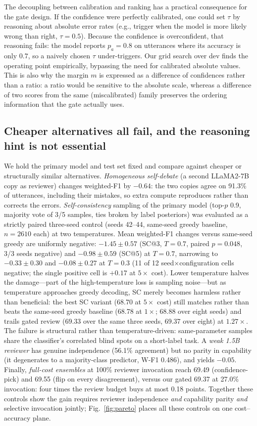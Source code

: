 \documentclass[final,5p,times,twocolumn]{elsarticle}
\begin{document}
The decoupling between calibration and ranking has a practical consequence
for the gate design. If the confidence were perfectly calibrated, one could
set $\tau$ by reasoning about absolute error rates (e.g., trigger when the
model is more likely wrong than right, $\tau{=}0.5$). Because the confidence
is overconfident, that reasoning fails: the model reports $p_a{=}0.8$ on
utterances where its accuracy is only $0.7$, so a naively chosen $\tau$
under-triggers. Our grid search over dev finds the operating point
empirically, bypassing the need for calibrated absolute values. This is
also why the margin $m$ is expressed as a difference of confidences rather
than a ratio: a ratio would be sensitive to the absolute scale, whereas a
difference of two scores from the same (miscalibrated) family preserves the
ordering information that the gate actually uses.

\subsection{Cheaper alternatives all fail, and the reasoning hint is not
essential}
\label{sec:controls}
We hold the primary model and test set fixed and compare against cheaper or
structurally similar alternatives.
\emph{Homogeneous self-debate} (a second LLaMA2-7B copy as reviewer) changes
weighted-F1 by $-0.64$: the two copies agree on 91.3\% of utterances,
including their mistakes, so extra compute reproduces rather than corrects
the errors. \emph{Self-consistency} sampling of the primary model
(top-$p$ 0.9, majority vote of 3/5 samples, ties broken by label posteriors)
was evaluated as a strictly paired three-seed control (seeds 42--44,
same-seed greedy baseline, $n{=}2610$ each) at two temperatures. Mean
weighted-F1 changes versus same-seed greedy are uniformly negative:
$-1.45 \pm 0.57$ (SC@3, $T{=}0.7$, paired $p{=}0.048$, 3/3 seeds negative)
and $-0.98 \pm 0.59$ (SC@5) at $T{=}0.7$, narrowing to $-0.33 \pm 0.30$
and $-0.08 \pm 0.27$ at $T{=}0.3$ (11 of 12 seed$\times$configuration cells
negative; the single positive cell is $+0.17$ at $5\times$ cost).
Lower temperature halves the damage---part of the high-temperature loss is
sampling noise---but as temperature approaches greedy decoding, SC merely
becomes harmless rather than beneficial: the best SC variant (68.70 at
$5\times$ cost) still matches rather than beats the same-seed greedy
baseline (68.78 at $1\times$; 68.88 over eight seeds) and trails gated
review (69.33 over the same three seeds, 69.37 over eight) at $1.27\times$. The failure is
structural rather than temperature-driven: same-parameter samples share the
classifier's correlated blind spots on a short-label task. A \emph{weak 1.5B reviewer} has genuine
independence (56.1\% agreement) but no parity in capability (it degenerates
to a majority-class predictor, W-F1 0.486), and yields $-0.05$. Finally,
\emph{full-cost ensembles} at 100\% reviewer invocation reach 69.49
(confidence-pick) and 69.55 (flip on every disagreement), versus our gated
69.37 at 27.0\% invocation: four times the review budget buys at most 0.18
points. Together these controls show the gain requires reviewer independence
\emph{and} capability parity \emph{and} selective invocation jointly;
Fig.~\ref{fig:pareto} places all these controls on one cost--accuracy
plane.
\end{document}

